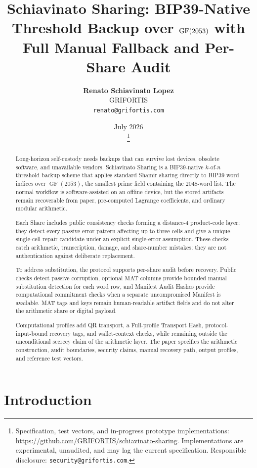 \documentclass[11pt]{article}
\title{\textbf{Schiavinato Sharing: BIP39-Native Threshold Backup over $\GF(2053)$ with Full Manual Fallback and Per-Share Audit}}
\author{
    \textbf{Renato Schiavinato Lopez} \\
    GRIFORTIS \\
    \texttt{renato@grifortis.com}
}
\date{July 2026\\\SchiavinatoSharingVersion\thanks{%
    Specification, test vectors, and in-progress prototype implementations:
    \url{https://github.com/GRIFORTIS/schiavinato-sharing}.
    Implementations are experimental, unaudited, and may lag the current specification.
    Responsible disclosure: \texttt{security@grifortis.com}.}}
\newcommand{\GF}{\operatorname{GF}}
\begin{document}
\maketitle

\begin{abstract}
Long-horizon self-custody needs backups that can survive lost devices, obsolete software, and unavailable vendors. Schiavinato Sharing is a BIP39-native $k$-of-$n$ threshold backup scheme that applies standard Shamir sharing directly to BIP39 word indices over $\GF(2053)$, the smallest prime field containing the 2048-word list. The normal workflow is software-assisted on an offline device, but the stored artifacts remain recoverable from paper, pre-computed Lagrange coefficients, and ordinary modular arithmetic.

Each Share includes public consistency checks forming a distance-4 product-code layer: they detect every passive error pattern affecting up to three cells and give a unique single-cell repair candidate under an explicit single-error assumption. These checks catch arithmetic, transcription, damage, and share-number mistakes; they are not authentication against deliberate replacement.

To address substitution, the protocol supports per-share audit before recovery. Public checks detect passive corruption, optional MAT columns provide bounded manual substitution detection for each word row, and Manifest Audit Hashes provide computational commitment checks when a separate uncompromised Manifest is available. MAT tags and keys remain human-readable artifact fields and do not alter the arithmetic share or digital payload.

Computational profiles add QR transport, a Full-profile Transport Hash, protocol-input-bound recovery tags, and wallet-context checks, while remaining outside the unconditional secrecy claim of the arithmetic layer. The paper specifies the arithmetic construction, audit boundaries, security claims, manual recovery path, output profiles, and reference test vectors.
\end{abstract}

\section{Introduction}
\label{sec:intro}
\end{document}
